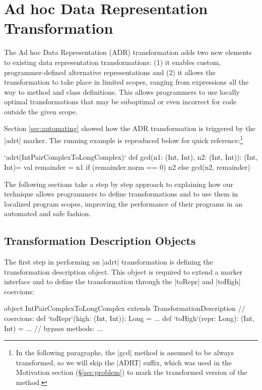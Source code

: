 \section{Ad hoc Data Representation Transformation}
\label{sec:ildl}

The Ad hoc Data Representation (ADR) transformation adds two new elements to existing data representation transformations: (1) it enables custom, programmer-defined alternative representations and (2) it allows the transformation to take place in limited scopes, ranging from expressions all the way to method and class definitions. This allows programmers to use locally optimal transformations that may be suboptimal or even incorrect for code outside the given scope.

Section \ref{sec:automating} showed how the ADR transformation is triggered by the |adrt| marker. The running example is reproduced below for quick reference:\footnote{In the following paragraphs, the |gcd| method is assumed to be always transformed, so we will skip the |ADRT| suffix, which was used in the Motivation section (\S\ref{sec:problem}) to mark the transformed version of the method.}

\begin{lstlisting-nobreak}
`adrt(IntPairComplexToLongComplex)` {
  def gcd(n1: (Int, Int), n2: (Int, Int)): (Int, Int)={
    val remainder = n1 %
    if (remainder.norm == 0) n2 else gcd(n2, remainder)
  }
}
\end{lstlisting-nobreak}

The following sections take a step by step approach to explaining how our technique allows programmers to define transformations and to use them in localized program scopes,  improving the performance of their programs in an automated and safe fashion.

\subsection{Transformation Description Objects}
\label{sec:ildl:custom}

The first step in performing an |adrt| transformation is defining the transformation description object. This object is required to extend a marker interface and to define the transformation through the |toRepr| and |toHigh| coercions:

\begin{lstlisting-nobreak}
object IntPairComplexToLongComplex
          extends TransformationDescription {
  // coercions:
  def `toRepr`(high: (Int, Int)): Long = ...
  def `toHigh`(repr: Long): (Int, Int) = ...
  // bypass methods:
  ...
}
\end{lstlisting-nobreak}

